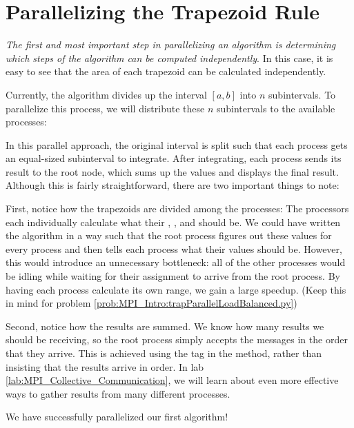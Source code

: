 \section*{Parallelizing the Trapezoid Rule}
\emph{The first and most important step in parallelizing an algorithm is
determining which steps of the algorithm can be computed independently}. In this
case, it is easy to see that the area of each trapezoid can be calculated
independently.

Currently, the algorithm divides up the interval $[a,b]$ into $n$ subintervals.
To parallelize this process, we will distribute these $n$ subintervals to the
available processes:



In this parallel approach, the original interval is split such that each process
gets an equal-sized subinterval to integrate. After integrating, each process
sends its result to the root node, which sums up the values and displays the
final result. Although this is fairly straightforward, there are two important
things to note:

First, notice how the trapezoids are divided among the processes: The processors
each individually calculate what their , , and
 should be. We could have written the algorithm in a way such that
the root process figures out these values for every process and then tells each
process what their values should be. However, this would introduce an
unnecessary bottleneck: all of the other processes would be idling while waiting
for their assignment to arrive from the root process. By having each process
calculate its own range, we gain a large speedup. (Keep this in mind for problem
\ref{prob:MPI_Intro:trapParallelLoadBalanced.py})

Second, notice how the results are summed. We know how many results we should be
receiving, so the root process simply accepts the messages in the order that
they arrive. This is achieved using the tag  in the
 method, rather than insisting that the results arrive in order.
In lab \ref{lab:MPI_Collective_Communication}, we will learn about even more
effective ways to gather results from many different processes.

We have successfully parallelized our first algorithm!

